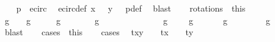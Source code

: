 \begin{isabellebody}
\ \ \isamarkupfalse%
\ {\isachardoublequoteopen}p\ {\isasymnotin}\ e{\isacharunderscore}circ{\isachardoublequoteclose}\ \isamarkupfalse%
\ e{\isacharunderscore}circ{\isacharunderscore}def\ {\isacartoucheopen}x\ {\isacharequal}\ {}{\isacartoucheclose}\ {\isacartoucheopen}y\ {\isacharequal}\ {}{\isacartoucheclose}\ p{\isacharunderscore}def\ \isamarkupfalse%
\ blast\isacommand{{\isacharbraceright}}\isamarkupfalse%
\isanewline
\ \ \isamarkupfalse%
\ rotations\ {\isacharequal}\ this\isanewline
\ \ \isacommand{{\isacharbraceleft}}\isamarkupfalse%
\isamarkupfalse%
\ {\isachardoublequoteopen}g\ {\isacharequal}\ {\isasymtau}\ {\isasymor}\ g\ {\isacharequal}\ {\isasymtau}\ {\isasymcirc}\ {\isasymrho}\ {\isasymor}\ g\ {\isacharequal}\ {\isasymtau}\ {\isasymcirc}\ {\isasymrho}\ {\isasymcirc}\ {\isasymrho}\ {\isasymor}\ g\ {\isacharequal}\ {\isasymtau}\ {\isasymcirc}\ {\isasymrho}\ {\isasymcirc}\ {\isasymrho}\ {\isasymcirc}\ {\isasymrho}{\isachardoublequoteclose}\isanewline
\ \ \isamarkupfalse%
\ \isamarkupfalse%
\ {\isacharparenleft}{}{\isacharparenright}\ {\isachardoublequoteopen}g\ {\isacharequal}\ {\isasymtau}{\isachardoublequoteclose}\ {\isacharbar}\ {\isacharparenleft}{}{\isacharparenright}\ {\isachardoublequoteopen}g\ {\isacharequal}\ {\isasymtau}\ {\isasymcirc}\ {\isasymrho}{\isachardoublequoteclose}\ {\isacharbar}\ {\isacharparenleft}{}{\isacharparenright}\ {\isachardoublequoteopen}g\ {\isacharequal}\ {\isasymtau}\ {\isasymcirc}\ {\isasymrho}\ {\isasymcirc}\ {\isasymrho}{\isachardoublequoteclose}\ {\isacharbar}\ {\isacharparenleft}{}{\isacharparenright}\ {\isachardoublequoteopen}g\ {\isacharequal}\ {\isasymtau}\ {\isasymcirc}\ {\isasymrho}\ {\isasymcirc}\ {\isasymrho}\ {\isasymcirc}\ {\isasymrho}{\isachardoublequoteclose}\ \isamarkupfalse%
\ blast\isanewline
\ \ \isamarkupfalse%
\ cases\ {\isacharequal}\ this\isanewline
\ \ \isamarkupfalse%
\ cases\ \isamarkupfalse%
\ {\isachardoublequoteopen}{}{\isacharasterisk}t{\isacharasterisk}x{\isacharasterisk}y\ {\isacharequal}\ {}\ {\isasymor}\ {\isacharparenleft}t{\isacharasterisk}x{\isacharcircum}{}\ {\isasymin}\ {\isacharbraceleft}{\isacharminus}{}{\isacharcomma}{}{\isacharbraceright}\ {\isasymand}\ t{\isacharasterisk}y{\isacharcircum}{}\ {\isasymin}\ {\isacharbraceleft}{\isacharminus}{}{\isacharcomma}{}{\isacharbraceright}{\isacharparenright}{\isachardoublequoteclose}\isanewline

\end{isabellebody}
